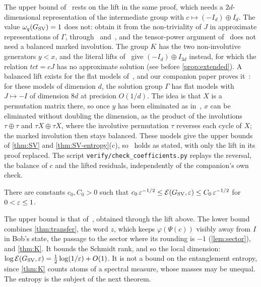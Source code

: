 The upper bound of~\cite[Theorem~1.1]{SV18} rests on the lift in the same proof, which needs a
$2d$-dimensional representation of the intermediate group with $c\mapsto(-I_d)\oplus I_d$. The value $\omega_q(G_{\mathrm{SV}})=1$ does
not: \cite{SV18} obtain it from the non-triviality of $J$ in approximate representations of $\Gamma$, through~\cite[Lemma~5.2
and Proposition~4.2]{Slo19} and~\cite[Corollary~5.3]{SV18}, and the tensor-power argument of~\cite[Lemma~5.2]{Slo19} does not
need a balanced marked involution. The group $K$ has the two non-involutive
generators $y<x$, and the literal lifts of~\cite[Proposition~4.8]{Slo19} give $(-I_d)\oplus I_{3d}$ instead, for which the relation
$tct=cJ$ has no approximate solution (see before \cref{prop:extended}). A balanced lift exists for the flat models
of~\cite[Example~11.11]{DM-game}, and our companion paper proves it~\cite[Lemma~11.13]{DM-game}: for these models of dimension $d$,
the solution group $\Gamma$ has flat models with $J\mapsto-I$ of dimension $8d$ at precision $O(1/d)$. The idea is that $X$ is a
permutation matrix there, so once $y$ has been eliminated as in~\cite[Proposition~4.8]{Slo19}, $x$ can be eliminated without doubling
the dimension, as the product of the involutions $\tau\oplus\tau$ and $\tau X\oplus\tau X$, where the involutive permutation $\tau$
reverses each cycle of $X$; the marked involution then stays balanced. These models give the upper bounds of \cref{thm:SV} and
\cref{thm:SV-entropy}(c), so~\cite[Theorem~1.1]{SV18} holds as stated, with only the lift in its proof replaced. The script \texttt{verify/check\_coefficients.py} replays the reversal, the balance of
$c$ and the lifted residuals, independently of the companion's own check.

\begin{theorem}\label{thm:SV}
There are constants $c_0,C_0>0$ such that $c_0\,\varepsilon^{-1/2}\le\mathcal E(G_{\mathrm{SV}},\varepsilon)\le C_0\,\varepsilon^{-1/2}$ for $0<\varepsilon\le1$.
\end{theorem}

The upper bound is that of~\cite[Theorem~1.1]{SV18}, obtained through the lift above. The lower
bound~\cite[Section~11.2]{DM-game} combines \cref{thm:transfer}, the word $z$, which keeps $\varphi(\Psi(c))$ visibly away from
$I$ in Bob's state, the passage to the sector where its rounding is $-1$ (\cref{lem:sector}), and \cref{thm:K}. It bounds the Schmidt rank, and so the local dimension: $\log\mathcal E(G_{\mathrm{SV}},\varepsilon)=
\frac12\log(1/\varepsilon)+O(1)$. It is not a bound on the entanglement entropy, since \cref{thm:K} counts atoms of a spectral measure,
whose masses may be unequal. The entropy is the subject of the next theorem.

